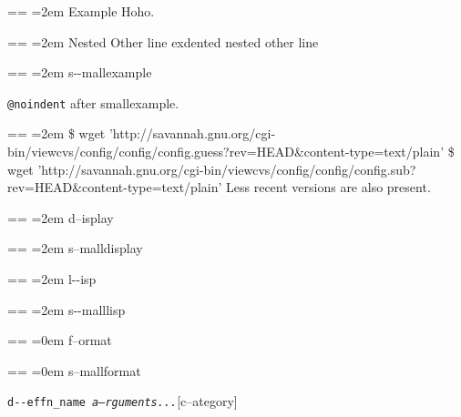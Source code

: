 \documentclass{book}
\makeatletter
\newenvironment{GNUTexinfopreformatted}{%
  \par\obeylines\obeyspaces\frenchspacing
  \parskip=\z@\parindent=\z@}{}
\makeatother
\begin{document}
\begin{titlepage}
\begin{GNUTexinfopreformatted}
\leftskip=2em\relax\ttfamily%
Example   Hoho.
\end{GNUTexinfopreformatted}
\begin{GNUTexinfopreformatted}
\leftskip=2em\relax\ttfamily%
Nested Other line
\end{GNUTexinfopreformatted}
\noindent exdented nested other line

\begin{GNUTexinfopreformatted}
\leftskip=2em\relax\ttfamily\footnotesize%
s{-}{-}mallexample
\end{GNUTexinfopreformatted}

\texttt{@noindent} after smallexample.
\begin{GNUTexinfopreformatted}
\leftskip=2em\relax\ttfamily\footnotesize%
\$ wget 'http://savannah.gnu.org/cgi-bin/viewcvs/config/config/config.guess?rev=HEAD\&content-type=text/plain'
\$ wget 'http://savannah.gnu.org/cgi-bin/viewcvs/config/config/config.sub?rev=HEAD\&content-type=text/plain'
\end{GNUTexinfopreformatted}
\noindent{}Less recent versions are also present.

\begin{GNUTexinfopreformatted}
\leftskip=2em\relax%
d--isplay
\end{GNUTexinfopreformatted}

\begin{GNUTexinfopreformatted}
\leftskip=2em\relax\footnotesize%
s--malldisplay
\end{GNUTexinfopreformatted}

\begin{GNUTexinfopreformatted}
\leftskip=2em\relax\ttfamily%
l{-}{-}isp
\end{GNUTexinfopreformatted}

\begin{GNUTexinfopreformatted}
\leftskip=2em\relax\ttfamily\footnotesize%
s{-}{-}malllisp
\end{GNUTexinfopreformatted}

\begin{GNUTexinfopreformatted}
\leftskip=0em\relax%
f--ormat
\end{GNUTexinfopreformatted}

\begin{GNUTexinfopreformatted}
\leftskip=0em\relax\footnotesize%
s--mallformat
\end{GNUTexinfopreformatted}

\noindent\texttt{d{-}{-}effn\_name \EmbracOn{}\textnormal{\textsl{a--rguments...}}\EmbracOff{}}\hfill[c--ategory]


\end{titlepage}
\end{document}
